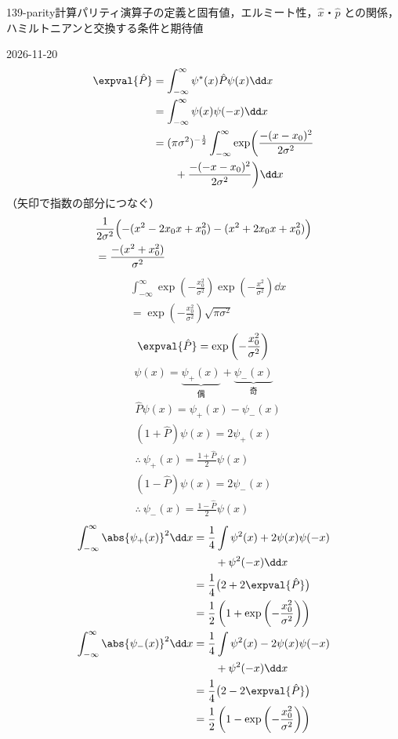 \documentclass[uplatex,dvipdfmx,a4paper,11pt]{jsarticle}
\begin{document}
\begin{mondai}{139-parity}{計算}{パリティ演算子の定義と固有値，エルミート性，$\hat{x}$・$\hat{p}$ との関係，ハミルトニアンと交換する条件と期待値}
\begin{kotaeutsushi}{2026-11-20}
\begin{align*}
\expval{\hat{P}}&=\int_{-\infty}^{\infty}\psi^{*}(x)\hat{P}\psi(x)\dd x\\
&=\int_{-\infty}^{\infty}\psi(x)\psi(-x)\dd x\\
&=(\pi\sigma^{2})^{-\frac{1}{2}}\int_{-\infty}^{\infty}\exp\biggl(\frac{-(x-x_{0})^{2}}{2\sigma^{2}}\\
&\qquad+\frac{-(-x-x_{0})^{2}}{2\sigma^{2}}\biggr)\dd x
\end{align*}
（矢印で指数の部分につなぐ）
\begin{align*}
&\frac{1}{2\sigma^{2}}\Bigl(-(x^{2}-2x_{0}x+x_{0}^{2})-(x^{2}+2x_{0}x+x_{0}^{2})\Bigr)\\
&=\frac{-(x^{2}+x_{0}^{2})}{\sigma^{2}}
\end{align*}
\begin{align*}
&\int_{-\infty}^{\infty}\exp\left(-\frac{x_{0}^{2}}{\sigma^{2}}\right)\exp\left(-\frac{x^{2}}{\sigma^{2}}\right)\dd x\\
&=\exp\left(-\frac{x_{0}^{2}}{\sigma^{2}}\right)\sqrt{\pi\sigma^{2}}
\end{align*}
\[ \expval{\hat{P}}=\exp\left(-\frac{x_{0}^{2}}{\sigma^{2}}\right) \]
\[ \psi(x)=\underbrace{\psi_{+}(x)}_{\text{偶}}+\underbrace{\psi_{-}(x)}_{\text{奇}} \]
\begin{align*}
&\hat{P}\psi(x)=\psi_{+}(x)-\psi_{-}(x)\\
&(1+\hat{P})\psi(x)=2\psi_{+}(x)\\
&\therefore\ \psi_{+}(x)=\frac{1+\hat{P}}{2}\psi(x)\\
&(1-\hat{P})\psi(x)=2\psi_{-}(x)\\
&\therefore\ \psi_{-}(x)=\frac{1-\hat{P}}{2}\psi(x)
\end{align*}
\begin{align*}
\int_{-\infty}^{\infty}\abs{\psi_{+}(x)}^{2}\dd x&=\frac{1}{4}\int\psi^{2}(x)+2\psi(x)\psi(-x)\\
&\qquad+\psi^{2}(-x)\dd x\\
&=\frac{1}{4}\bigl(2+2\expval{\hat{P}}\bigr)\\
&=\frac{1}{2}\left(1+\exp\left(-\frac{x_{0}^{2}}{\sigma^{2}}\right)\right)\\
\int_{-\infty}^{\infty}\abs{\psi_{-}(x)}^{2}\dd x&=\frac{1}{4}\int\psi^{2}(x)-2\psi(x)\psi(-x)\\
&\qquad+\psi^{2}(-x)\dd x\\
&=\frac{1}{4}\bigl(2-2\expval{\hat{P}}\bigr)\\
&=\frac{1}{2}\left(1-\exp\left(-\frac{x_{0}^{2}}{\sigma^{2}}\right)\right)

\end{align*}
\end{kotaeutsushi}
\end{mondai}
\end{document}
